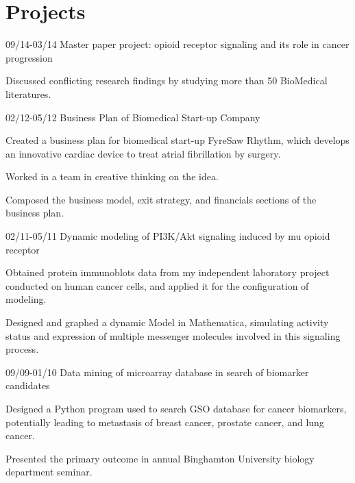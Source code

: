\section{Projects}
\begin{entrylist}
	\entry
		{09/14-03/14}
		{Master paper project: opioid receptor signaling and its role in cancer
			progression}
		{}
		{
			\begin{tightemize}
				\item{Discussed conflicting research findings by studying more than 50 BioMedical
					literatures.}
			\end{tightemize}
		}
	\entry
		{02/12-05/12}
		{Business Plan of Biomedical Start-up Company}
		{}
		{
			\begin{tightemize}
				\item{Created a business plan for biomedical start-up FyreSaw
					Rhythm, which develops an innovative cardiac device to treat atrial
					fibrillation by surgery.}
				\item{Worked in a team in creative thinking on the idea.}
				\item{Composed the business model, exit strategy, and financials
					sections of the business plan.}
			\end{tightemize}
		}
	\entry
		{02/11-05/11}
		{Dynamic modeling of PI3K/Akt signaling induced by mu opioid receptor}
		{}
		{
			\begin{tightemize}
				\item{Obtained protein immunoblots data from my independent laboratory project
					conducted on human cancer cells, and applied it for the configuration of
					modeling.}
				\item{Designed and graphed a dynamic Model in Mathematica, simulating activity
					status and expression of multiple messenger molecules involved in this
					signaling process.}
			\end{tightemize}
		}
	\entry
		{09/09-01/10}
		{Data mining of microarray database in search of biomarker candidates}
		{}
		{
			\begin{tightemize}
				\item{Designed a Python program used to search GSO database for cancer
					biomarkers, potentially leading to metastasis of breast cancer, prostate
					cancer, and lung cancer.}
				\item{Presented the primary outcome in annual Binghamton University biology
					department seminar.}
			\end{tightemize}
		}
\end{entrylist}
